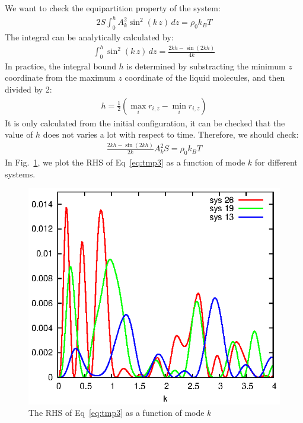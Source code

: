 \documentclass[aip,jcp,a4paper,reprint,onecolumn]{revtex4-1}
\begin{document}
We want to check the equipartition property of the system:
\begin{align}
  2S \int_0^h A_k^2 \sin^2 (k\, z) \,dz = \rho_0k_BT
\end{align}
The integral can be analytically calculated by:
\begin{align}
  \int_0^h\sin^2 (k\, z) \,dz  = \frac{2kh - \sin(2kh)}{4k}
\end{align}
In practice, the integral bound $h$ is determined by substracting the minimum $z$ coordinate
from the maximum $z$ coordinate of the liquid molecules, and then divided by 2:
\begin{align}
  h = \frac12 (\max_{i} r_{i,z} - \min_i r_{i,z})
\end{align}
It is only calculated from the initial configuration, it can be
checked that the value of $h$ does not varies a lot with respect to
time.  Therefore, we should check:
\begin{align}\label{eq:tmp3}
  \frac{2kh - \sin(2kh)}{2k} A_k^2 S = \rho_0 k_BT
\end{align}
In Fig.~\ref{fig:tmp1}, we plot the RHS of Eq~\ref{eq:tmp3} as a function of mode $k$
for different systems.
\begin{figure}
  \centering
  \includegraphics[]{fig/fig-energy.eps}
  \caption{The RHS of Eq~\ref{eq:tmp3} as a function of mode $k$}
  \label{fig:tmp1}
\end{figure}
\end{document}
